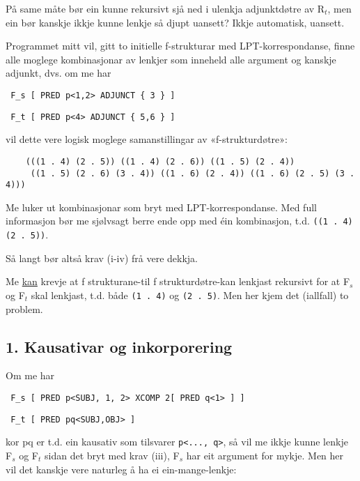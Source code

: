 \documentclass[11pt,a4paper,oneside,draft]{book}
\begin{document}
På same måte bør ein kunne rekursivt sjå ned i ulenkja adjunktdøtre av
R$_t$, men ein bør kanskje ikkje kunne lenkje så djupt uansett? Ikkje
automatisk, uansett.



Programmet mitt vil, gitt to initielle f-strukturar med
LPT-korrespondanse, finne alle moglege kombinasjonar av lenkjer som
inneheld alle argument og kanskje adjunkt, dvs. om me har

\begin{verbatim}
 F_s [ PRED p<1,2> ADJUNCT { 3 } ]
\end{verbatim}


\begin{verbatim}
 F_t [ PRED p<4> ADJUNCT { 5,6 } ]
\end{verbatim}


vil dette vere logisk moglege samanstillingar av «f-strukturdøtre»:

\begin{verbatim}
    (((1 . 4) (2 . 5)) ((1 . 4) (2 . 6)) ((1 . 5) (2 . 4))
     ((1 . 5) (2 . 6) (3 . 4)) ((1 . 6) (2 . 4)) ((1 . 6) (2 . 5) (3 . 4)))
\end{verbatim}


Me luker ut kombinasjonar som bryt med LPT-korrespondanse. Med full
informasjon bør me sjølvsagt berre ende opp med éin kombinasjon,
t.d. \texttt{((1 . 4) (2 . 5))}.

Så langt bør altså krav (i-iv) frå \citet{dyvik2009lmp} vere dekkja.

Me \underline{kan} krevje at f strukturane-til f strukturdøtre-kan lenkjast
rekursivt for at F$_s$ og F$_t$ skal lenkjast, t.d. både \texttt{(1 . 4)} og \texttt{(2 . 5)}. Men her kjem det (iallfall) to problem.


\subsection{1. Kausativar og inkorporering}
\label{sec-3.13.1}

Om me har 

\begin{verbatim}
 F_s [ PRED p<SUBJ, 1, 2> XCOMP 2[ PRED q<1> ] ]
\end{verbatim}


\begin{verbatim}
 F_t [ PRED pq<SUBJ,OBJ> ]
\end{verbatim}


kor pq er t.d. ein kausativ som tilsvarer \texttt{p<..., q>}, så vil me ikkje
kunne lenkje F$_s$ og F$_t$ sidan det bryt med krav (iii), F$_s$ har eit
argument for mykje. Men her vil det kanskje vere naturleg å ha ei
ein-mange-lenkje:
\end{document}
